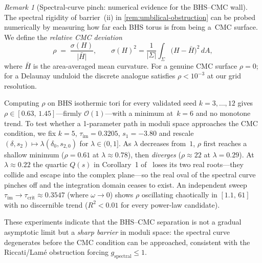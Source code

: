 \documentclass[11pt,a4paper]{article}
\theoremstyle{plain}
\theoremstyle{definition}
\theoremstyle{remark}
\newtheorem{remark}[theorem]{Remark}
\newcommand{\Oo}{\mathcal{O}}
\begin{document}
\begin{remark}[Spectral-curve pinch: numerical evidence for
  the BHS--CMC wall]
\label{rem:spectral-pinch}
The spectral rigidity of barrier~(ii) in
\cref{rem:umbilical-obstruction} can be probed numerically by
measuring how far each BHS torus is from being a~CMC surface.
We define the \emph{relative CMC deviation}
\[
  \rho \;=\; \frac{\sigma(H)}{\lvert\bar{H}\rvert},
  \qquad
  \sigma(H)^{2}
  = \frac{1}{\lvert\Sigma\rvert}
    \int_{\Sigma}\!\bigl(H - \bar{H}\bigr)^{2}\,dA,
\]
where $\bar{H}$ is the area-averaged mean curvature.
For a genuine CMC surface $\rho = 0$; for a Delaunay unduloid
the discrete analogue satisfies
$\rho < 10^{-3}$ at our grid resolution.

Computing $\rho$ on BHS isothermic tori for every validated seed
$k = 3, \dots, 12$ gives $\rho \in [0.63, \, 1.45]$---firmly
$\Oo(1)$---with a minimum at~$k = 6$ and no monotone trend.
To test whether a 1-parameter path in moduli space
approaches the CMC condition, we fix $k = 5$,
$\tau_{\mathrm{im}} = 0.3205$, $s_1 = -3.80$ and rescale
$(\delta, s_2) \mapsto \lambda(\delta_0, s_{2,0})$ for
$\lambda \in (0, 1]$.  As $\lambda$ decreases from~$1$,
$\rho$ first reaches a shallow minimum ($\rho = 0.61$ at
$\lambda \approx 0.78$), then \emph{diverges}
($\rho \approx 22$ at $\lambda = 0.29$).
At $\lambda \approx 0.22$ the quartic $Q(s)$ in
Corollary~1 of~\cite{BHS-comp} loses its two real roots---they
collide and escape into the complex plane---so the real oval
of the spectral curve pinches off and the integration domain
ceases to exist.
An independent sweep $\tau_{\mathrm{im}} \to \tau_{\mathrm{crit}}
\approx 0.3547$ (where $\omega \to 0$) shows $\rho$ oscillating
chaotically in $[1.1, \, 61]$ with no discernible trend
($R^{2} < 0.01$ for every power-law candidate).

These experiments indicate that the BHS--CMC separation is not a
gradual asymptotic limit but a \emph{sharp barrier} in
moduli space: the spectral curve degenerates before the CMC
condition can be approached, consistent with the Riccati/Lam\'{e}
obstruction forcing $g_{\mathrm{spectral}} \le 1$.
\end{remark}
\end{document}
